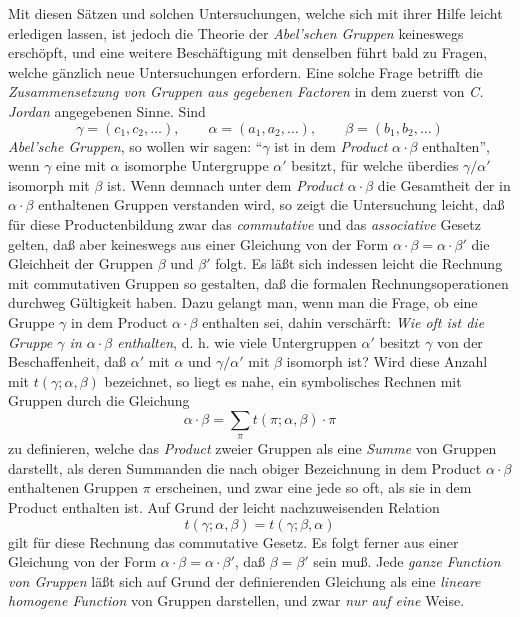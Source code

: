 \documentclass[11pt,a4paper]{article}
\begin{document}
Mit diesen Sätzen und solchen Untersuchungen, welche sich mit ihrer Hilfe leicht erledigen lassen, ist jedoch die Theorie der \emph{Abel'schen Gruppen} keineswegs erschöpft, und eine weitere Beschäftigung mit denselben führt bald zu Fragen, welche gänzlich neue Untersuchungen erfordern. Eine solche Frage betrifft die \emph{Zusammensetzung von Gruppen aus gegebenen Factoren} in dem zuerst von \emph{C. Jordan} angegebenen Sinne. Sind
\[
 \gamma=(c_1,c_2,\ldots),\qquad
 \alpha=(a_1,a_2,\ldots),\qquad
 \beta=(b_1,b_2,\ldots)
\]
\emph{Abel'sche Gruppen}, so wollen wir sagen: ``$\gamma$ ist in dem \emph{Product} $\alpha\cdot\beta$ enthalten'', wenn $\gamma$ eine mit $\alpha$ isomorphe Untergruppe $\alpha'$ besitzt, für welche überdies $\gamma/\alpha'$ isomorph mit $\beta$ ist. Wenn demnach unter dem \emph{Product} $\alpha\cdot\beta$ die Gesamtheit der in $\alpha\cdot\beta$ enthaltenen Gruppen verstanden wird, so zeigt die Untersuchung leicht, daß für diese Productenbildung zwar das \emph{commutative} und das \emph{associative} Gesetz gelten, daß aber keineswegs aus einer Gleichung von der Form $\alpha\cdot\beta=\alpha\cdot\beta'$ die Gleichheit der Gruppen $\beta$ und $\beta'$ folgt. Es läßt sich indessen leicht die Rechnung mit commutativen Gruppen so gestalten, daß die formalen Rechnungsoperationen durchweg Gültigkeit haben. Dazu gelangt man, wenn man die Frage, ob eine Gruppe $\gamma$ in dem Product $\alpha\cdot\beta$ enthalten sei, dahin verschärft: \emph{Wie oft ist die Gruppe $\gamma$ in $\alpha\cdot\beta$ enthalten}, d. h. wie viele Untergruppen $\alpha'$ besitzt $\gamma$ von der Beschaffenheit, daß $\alpha'$ mit $\alpha$ und $\gamma/\alpha'$ mit $\beta$ isomorph ist? Wird diese Anzahl mit $t(\gamma;\alpha,\beta)$ bezeichnet, so liegt es nahe, ein symbolisches Rechnen mit Gruppen durch die Gleichung
\[
 \alpha\cdot\beta=\sum_{\pi} t(\pi;\alpha,\beta)\cdot\pi
\]
zu definieren, welche das \emph{Product} zweier Gruppen als eine \emph{Summe} von Gruppen darstellt, als deren Summanden die nach obiger Bezeichnung in dem Product $\alpha\cdot\beta$ enthaltenen Gruppen $\pi$ erscheinen, und zwar eine jede so oft, als sie in dem Product enthalten ist. Auf Grund der leicht nachzuweisenden Relation
\[
 t(\gamma;\alpha,\beta)=t(\gamma;\beta,\alpha)
\]
gilt für diese Rechnung das commutative Gesetz. Es folgt ferner aus einer Gleichung von der Form $\alpha\cdot\beta=\alpha\cdot\beta'$, daß $\beta=\beta'$ sein muß. Jede \emph{ganze Function von Gruppen} läßt sich auf Grund der definierenden Gleichung als eine \emph{lineare homogene Function} von Gruppen darstellen, und zwar \emph{nur auf eine} Weise.
\end{document}
